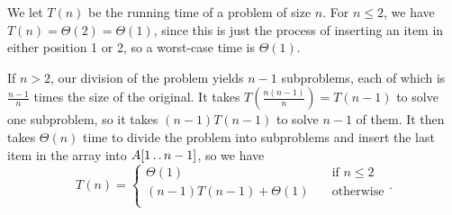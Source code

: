  
 We let $T(n)$ be the running time of a problem of size $n$. For $n \leq 2$, we have
 $T(n) = \Theta(2) = \Theta(1)$, since this is just the process of inserting an item 
 in either position 1 or 2, so a worst-case time is $\Theta(1)$.

 If $n > 2$, our division of the problem yields $n - 1$ subproblems, each of which is
 $\frac{n - 1}{n}$ times the size of the original. It takes $T(\frac{n(n-1)}{n}) = T(n-1)$
 to solve one subproblem, so it takes $(n-1)T(n-1)$ to solve $n - 1$ of them. It then
 takes $\Theta(n)$ time to divide the problem into subproblems and insert the last item
 in the array into $A[1\mathinner{{\ldotp}\,{\ldotp}} n-1]$, so we have
 \[
     T(n) = \begin{cases}
         \Theta(1) \quad &\text{if } n \leq 2 \\
         (n-1)T(n-1) + \Theta(1) \quad &\text{otherwise} \\
    \end{cases}.
 \]
